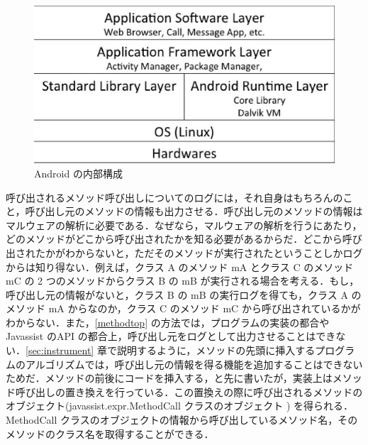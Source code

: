 \begin{figure}[t]
\begin{center}
\includegraphics[scale=0.5]{structure2.eps}
\end{center}
\caption{Android の内部構成}
\label{structure}
\end{figure}

呼び出されるメソッド呼び出しについてのログには，それ自身はもちろんのこと，呼び出し元のメソッドの情報も出力させる．呼び出し元のメソッドの情報はマルウェアの解析に必要である．なぜなら，マルウェアの解析を行うにあたり，どのメソッドがどこから呼び出されたかを知る必要があるからだ．どこから呼び出されたかがわからないと，ただそのメソッドが実行されたということしかログからは知り得ない．例えば，クラス A のメソッド mA とクラス C のメソッド mC の 2 つのメソッドからクラス B の mB が実行される場合を考える．もし，呼び出し元の情報がないと，クラス B の mB の実行ログを得ても，クラス A のメソッド mA からなのか，クラス C のメソッド mC から呼び出されているかがわからない．また，\ref{methodtop} の方法では，プログラムの実装の都合や Javassist のAPI の都合上，呼び出し元をログとして出力させることはできない．\ref{sec:instrument} 章で説明するように，メソッドの先頭に挿入するプログラムのアルゴリズムでは，呼び出し元の情報を得る機能を追加することはできないためだ．メソッドの前後にコードを挿入する，と先に書いたが，実装上はメソッド呼び出しの置き換えを行っている．この置換えの際に呼び出されるメソッドのオブジェクト(javassist.expr.MethodCall クラスのオブジェクト ) を得られる．MethodCall クラスのオブジェクトの情報から呼び出しているメソッド名，そのメソッドのクラス名を取得することができる．

